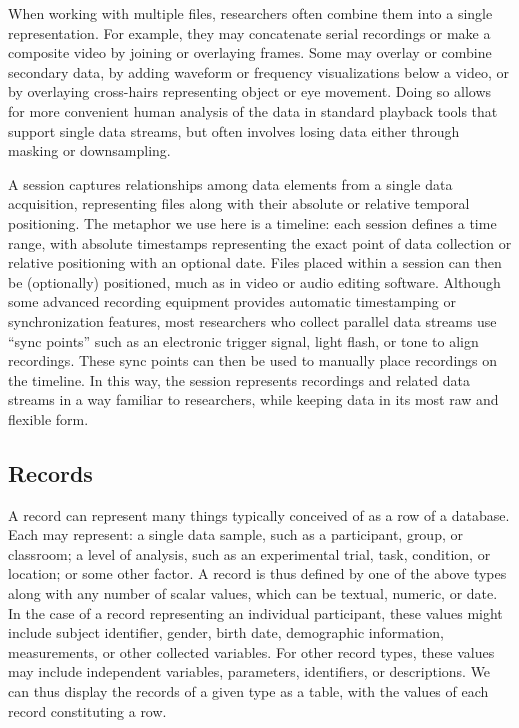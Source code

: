 \documentclass{sig-alternate}
\begin{document}
When working with multiple files, researchers often combine them into a single representation.
For example, they may concatenate serial recordings or make a composite video by joining or overlaying frames.
Some may overlay or combine secondary data, by adding waveform or frequency visualizations below a video, or by overlaying cross-hairs representing object or eye movement.
Doing so allows for more convenient human analysis of the data in standard playback tools that support single data streams, but often involves losing data either through masking or downsampling.

A session captures relationships among data elements from a single data acquisition, representing files along with their absolute or relative temporal positioning.
The metaphor we use here is a timeline: each session defines a time range, with absolute timestamps representing the exact point of data collection or relative positioning with an optional date.
Files placed within a session can then be (optionally) positioned, much as in video or audio editing software.
Although some advanced recording equipment provides automatic timestamping or synchronization features, most researchers who collect parallel data streams use ``sync points'' such as an electronic trigger signal, light flash, or tone to align recordings.
These sync points can then be used to manually place recordings on the timeline.
In this way, the session represents recordings and related data streams in a way familiar to researchers, while keeping data in its most raw and flexible form.

\subsection{Records}

A record can represent many things typically conceived of as a row of a database.
Each may represent: a single data sample, such as a participant, group, or classroom; a level of analysis, such as an experimental trial, task, condition, or location; or some other factor. 
A record is thus defined by one of the above types along with any number of scalar values, which can be textual, numeric, or date.
In the case of a record representing an individual participant, these values might include subject identifier, gender, birth date, demographic information, measurements, or other collected variables.
For other record types, these values may include independent variables, parameters, identifiers, or descriptions. 
We can thus display the records of a given type as a table, with the values of each record constituting a row.
\end{document}
